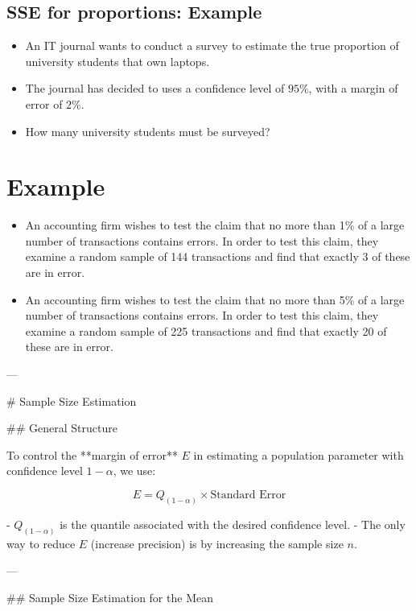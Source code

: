 
\subsection{SSE for proportions: Example}
\begin{itemize}
\item An IT journal wants to conduct a survey to estimate the true proportion of university students that own laptops.
\item The journal has decided to uses a confidence level of $95\%$, with a margin of error of $2\%$.
\item How many university students must be surveyed?
\end{itemize}


\section{Example}
\begin{itemize}
\item An accounting firm wishes to test the claim that no more than 1\% of a large
number of transactions contains errors. In order to test this claim, they
examine a random sample of 144 transactions and find that exactly 3 of
these are in error.

\item An accounting firm wishes to test the claim that no more than 5\% of a large
number of transactions contains errors. In order to test this claim, they examine a
random sample of 225 transactions and find that exactly 20 of these are in error.
\end{itemize}




---

# Sample Size Estimation

## General Structure

To control the **margin of error** \( E \) in estimating a population parameter with confidence level \( 1 - \alpha \), we use:

\[
E = Q_{(1-\alpha)} \times \text{Standard Error}
\]

- \( Q_{(1-\alpha)} \) is the quantile associated with the desired confidence level.
- The only way to reduce \( E \) (increase precision) is by increasing the sample size \( n \).

---

## Sample Size Estimation for the Mean

